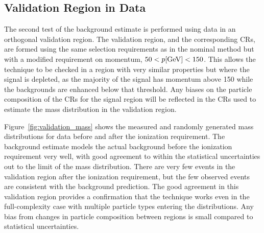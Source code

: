\subsection{Validation Region in Data}
The second test of the background estimate is performed using data in an orthogonal validation region.
The validation region, and the corresponding \acp{CR}, are formed using the same selection requirements as in the nominal method but with a modified requirement on momentum, $50 < p [\mathrm{Ge\kern -0.05em V}] < 150$.
This allows the technique to be checked in a region with very similar properties but where the signal is depleted, as the majority of the signal has momentum above 150 \GeV while the backgrounds are enhanced below that threshold.
Any biases on the particle composition of the \acp{CR} for the signal region will be reflected in the \acp{CR} used to estimate the mass distribution in the validation region.


Figure~\ref{fig:validation_mass} shows the measured and randomly generated mass distributions for data before and after the ionization requirement.
The background estimate models the actual background before the ionization requirement very well, with good agreement to within the statistical uncertainties out to the limit of the mass distribution.
There are very few events in the validation region after the ionization requirement, but the few observed events are consistent with the background prediction.
The good agreement in this validation region provides a confirmation that the technique works even in the full-complexity case with multiple particle types entering the distributions.
Any bias from changes in particle composition between regions is small compared to statistical uncertainties.

